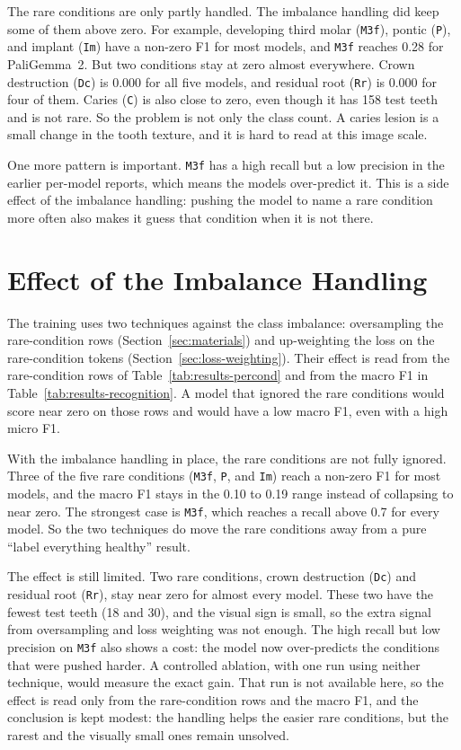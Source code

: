 \documentclass[a4paper,12pt]{report}
\begin{document}
The rare conditions are only partly handled. The imbalance handling did keep some of them above zero. For example, developing third molar (\texttt{M3f}), pontic (\texttt{P}), and implant (\texttt{Im}) have a non-zero F1 for most models, and \texttt{M3f} reaches 0.28 for PaliGemma~2. But two conditions stay at zero almost everywhere. Crown destruction (\texttt{Dc}) is 0.000 for all five models, and residual root (\texttt{Rr}) is 0.000 for four of them. Caries (\texttt{C}) is also close to zero, even though it has 158 test teeth and is not rare. So the problem is not only the class count. A caries lesion is a small change in the tooth texture, and it is hard to read at this image scale.

One more pattern is important. \texttt{M3f} has a high recall but a low precision in the earlier per-model reports, which means the models over-predict it. This is a side effect of the imbalance handling: pushing the model to name a rare condition more often also makes it guess that condition when it is not there.

\section{Effect of the Imbalance Handling}

The training uses two techniques against the class imbalance: oversampling the rare-condition rows (Section~\ref{sec:materials}) and up-weighting the loss on the rare-condition tokens (Section~\ref{sec:loss-weighting}). Their effect is read from the rare-condition rows of Table~\ref{tab:results-percond} and from the macro F1 in Table~\ref{tab:results-recognition}. A model that ignored the rare conditions would score near zero on those rows and would have a low macro F1, even with a high micro F1.

With the imbalance handling in place, the rare conditions are not fully ignored. Three of the five rare conditions (\texttt{M3f}, \texttt{P}, and \texttt{Im}) reach a non-zero F1 for most models, and the macro F1 stays in the 0.10 to 0.19 range instead of collapsing to near zero. The strongest case is \texttt{M3f}, which reaches a recall above 0.7 for every model. So the two techniques do move the rare conditions away from a pure ``label everything healthy'' result.

The effect is still limited. Two rare conditions, crown destruction (\texttt{Dc}) and residual root (\texttt{Rr}), stay near zero for almost every model. These two have the fewest test teeth (18 and 30), and the visual sign is small, so the extra signal from oversampling and loss weighting was not enough. The high recall but low precision on \texttt{M3f} also shows a cost: the model now over-predicts the conditions that were pushed harder. A controlled ablation, with one run using neither technique, would measure the exact gain. That run is not available here, so the effect is read only from the rare-condition rows and the macro F1, and the conclusion is kept modest: the handling helps the easier rare conditions, but the rarest and the visually small ones remain unsolved.
\end{document}
